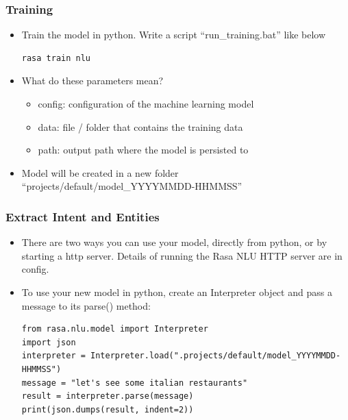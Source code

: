  \begin{frame}[fragile]\frametitle{Training}
\begin{itemize}
\item Train the model in python. Write a script ``run\_training.bat'' like below
\begin{lstlisting}
rasa train nlu
\end{lstlisting}
\item What do these parameters mean?

\begin{itemize}
\item config: configuration of the machine learning model
\item data: file / folder that contains the training data
\item path: output path where the model is persisted to
\end{itemize}
\item Model will be created in a new folder ``projects/default/model\_YYYYMMDD-HHMMSS''
\end{itemize}
\end{frame}

 \begin{frame}[fragile]\frametitle{Extract Intent and Entities}
\begin{itemize}
\item There are two ways you can use your model, directly from python, or by starting a http server. Details of running the Rasa NLU HTTP server are in config.
\item To use your new model in python, create an Interpreter object and pass a message to its parse() method:
\begin{lstlisting}
from rasa.nlu.model import Interpreter
import json
interpreter = Interpreter.load(".projects/default/model_YYYYMMDD-HHMMSS")
message = "let's see some italian restaurants"
result = interpreter.parse(message)
print(json.dumps(result, indent=2))
\end{lstlisting}
\end{itemize}

\end{frame}

